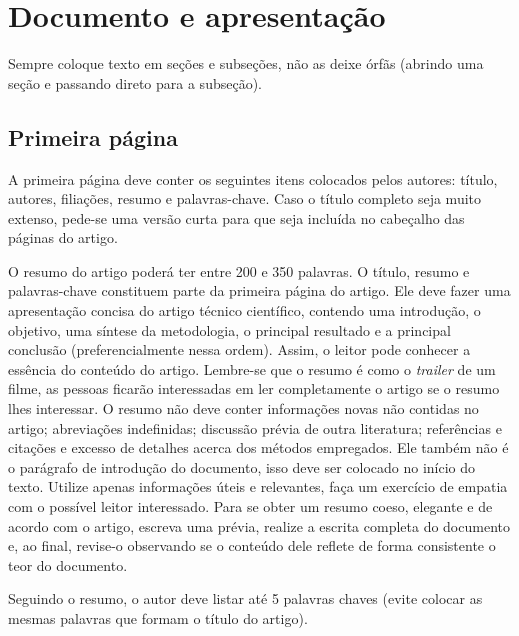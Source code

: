 \documentclass[12pt, a4paper, twoside, twocolumn]{article}
\begin{document}
\section{Documento e apresentação}

Sempre coloque texto em seções e subseções, não as deixe órfãs (abrindo uma seção e passando direto para a subseção).

\subsection{Primeira página}

A primeira página deve conter os seguintes itens colocados pelos autores: título, autores, filiações, resumo e palavras-chave. 
%
Caso o título completo seja muito extenso, pede-se uma versão curta para que seja incluída no cabeçalho das páginas do artigo. 

O resumo do artigo poderá ter entre 200 e 350 palavras. O título, resumo e palavras-chave constituem parte da primeira página do artigo. Ele deve fazer uma apresentação concisa do artigo técnico científico, contendo uma introdução, o objetivo, uma síntese da metodologia, o principal resultado e a principal conclusão (preferencialmente nessa ordem). Assim, o leitor pode conhecer a essência do conteúdo do artigo. Lembre-se que o resumo é como o \textit{trailer} de um filme, as pessoas ficarão interessadas em ler completamente o artigo se o resumo lhes interessar. O resumo não deve conter informações novas não contidas no artigo; abreviações indefinidas; discussão prévia de outra literatura; referências e citações e excesso de detalhes acerca dos métodos empregados. Ele também não é o parágrafo de introdução do documento, isso deve ser colocado no início do texto. Utilize apenas informações úteis e relevantes, faça um exercício de empatia com o possível leitor interessado. Para se obter um resumo coeso, elegante e de acordo com o artigo, escreva uma prévia, realize a escrita completa do documento e, ao final, revise-o observando se o conteúdo dele reflete de forma consistente o teor do documento. 

Seguindo o resumo, o autor deve listar até 5 palavras chaves (evite colocar as mesmas palavras que formam o título do artigo).
\end{document}
